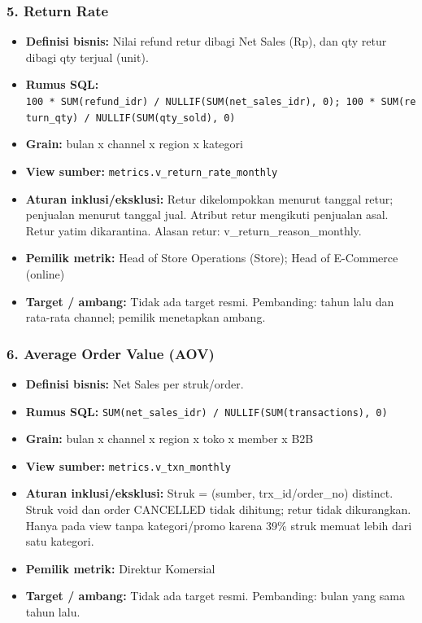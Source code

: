 \documentclass[10pt,a4paper]{article}
\providecommand{\tightlist}{\setlength{\itemsep}{1pt}\setlength{\parskip}{0pt}}
\begin{document}
\subsubsection{5. Return Rate}\label{return-rate}

\begin{itemize}
\tightlist
\item
  \textbf{Definisi bisnis:} Nilai refund retur dibagi Net Sales (Rp), dan qty retur dibagi qty terjual (unit).
\item
  \textbf{Rumus SQL:} \texttt{100\ *\ SUM(refund\_\allowbreak{}idr)\ /\ NULLIF(SUM(net\_\allowbreak{}sales\_\allowbreak{}idr),\ 0);\ 100\ *\ SUM(return\_\allowbreak{}qty)\ /\ NULLIF(SUM(qty\_\allowbreak{}sold),\ 0)}
\item
  \textbf{Grain:} bulan x channel x region x kategori
\item
  \textbf{View sumber:} \texttt{metrics.v\_\allowbreak{}return\_\allowbreak{}rate\_\allowbreak{}monthly}
\item
  \textbf{Aturan inklusi/eksklusi:} Retur dikelompokkan menurut tanggal retur; penjualan menurut tanggal jual. Atribut retur mengikuti penjualan asal. Retur yatim dikarantina. Alasan retur: v\_\allowbreak{}return\_\allowbreak{}reason\_\allowbreak{}monthly.
\item
  \textbf{Pemilik metrik:} Head of Store Operations (Store); Head of E-Commerce (online)
\item
  \textbf{Target / ambang:} Tidak ada target resmi. Pembanding: tahun lalu dan rata-rata channel; pemilik menetapkan ambang.
\end{itemize}

\subsubsection{6. Average Order Value (AOV)}\label{average-order-value-aov}

\begin{itemize}
\tightlist
\item
  \textbf{Definisi bisnis:} Net Sales per struk/order.
\item
  \textbf{Rumus SQL:} \texttt{SUM(net\_\allowbreak{}sales\_\allowbreak{}idr)\ /\ NULLIF(SUM(transactions),\ 0)}
\item
  \textbf{Grain:} bulan x channel x region x toko x member x B2B
\item
  \textbf{View sumber:} \texttt{metrics.v\_\allowbreak{}txn\_\allowbreak{}monthly}
\item
  \textbf{Aturan inklusi/eksklusi:} Struk = (sumber, trx\_\allowbreak{}id/order\_\allowbreak{}no) distinct. Struk void dan order CANCELLED tidak dihitung; retur tidak dikurangkan. Hanya pada view tanpa kategori/promo karena 39\% struk memuat lebih dari satu kategori.
\item
  \textbf{Pemilik metrik:} Direktur Komersial
\item
  \textbf{Target / ambang:} Tidak ada target resmi. Pembanding: bulan yang sama tahun lalu.
\end{itemize}
\end{document}
